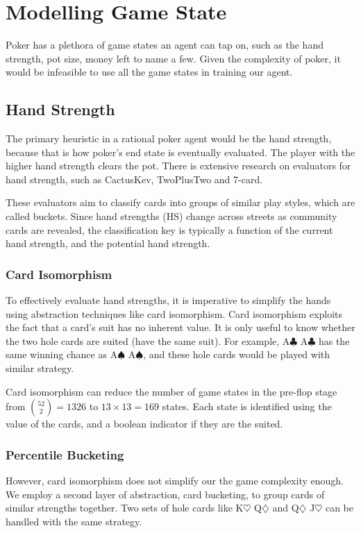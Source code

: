 \documentclass{article}
\begin{document}
\section{Modelling Game State}
Poker has a plethora of game states an agent can tap on, such as the hand strength, pot size, money left to name a few. Given the complexity of poker, it would be infeasible to use all the game states in training our agent.

\subsection{Hand Strength}
The primary heuristic in a rational poker agent would be the hand strength, because that is how poker's end state is eventually evaluated. The player with the higher hand strength clears the pot. There is extensive research on evaluators for hand strength, such as CactusKev, TwoPlusTwo and 7-card.

These evaluators aim to classify cards into groups of similar play styles, which are called buckets. Since hand strengths (HS) change across streets as community cards are revealed, the classification key is typically a function of the current hand strength, and the potential hand strength.

\subsubsection{Card Isomorphism}
To effectively evaluate hand strengths, it is imperative to simplify the hands using abstraction techniques like card isomorphism. Card isomorphism exploits the fact that a card's suit has no inherent value. It is only useful to know whether the two hole cards are suited (have the same suit). For example, A$\clubsuit$ A$\clubsuit$ has the same winning chance as A$\spadesuit$ A$\spadesuit$, and these hole cards would be played with similar strategy.

Card isomorphism can reduce the number of game states in the pre-flop stage from ${52 \choose 2} = 1326$ to $13 \times 13 = 169$ states. Each state is identified using the value of the cards, and a boolean indicator if they are the suited.

\subsubsection{Percentile Bucketing}
However, card isomorphism does not simplify our the game complexity enough. We employ a second layer of abstraction, card bucketing, to group cards of similar strengths together. Two sets of hole cards like K$\heartsuit$ Q$\diamondsuit$ and Q$\diamondsuit$ J$\heartsuit$ can be handled with the same strategy.
\end{document}
